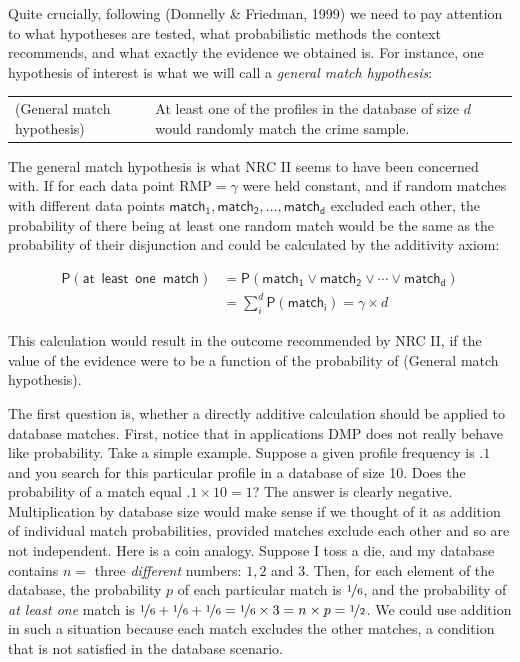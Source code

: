 \documentclass[10pt,dvipsnames,enabledeprecatedfontcommands]{scrartcl}
\newcommand{\pr}[1]{\mathsf{P}(#1)}
\begin{document}
Quite crucially, following (Donnelly \& Friedman, 1999) we need to pay
attention to what hypotheses are tested, what probabilistic methods the
context recommends, and what exactly the evidence we obtained is. For
instance, one hypothesis of interest is what we will call a
\emph{general match hypothesis}: \vspace{1mm}

\begin{tabular}{lp{8cm}}
(General match hypothesis) &
At least one of the profiles in the database of size $d$ 
would randomly match the crime sample.
\end{tabular}

\vspace{1mm} \noindent The general match hypothesis is what NRC II seems
to have been concerned with. If for each data point RMP\(=\gamma\) were
held constant, and if random matches with different data points
\(\mathsf{match_1, match_2, \dots, match_d}\) excluded each other, the
probability of there being at least one random match would be the same
as the probability of their disjunction and could be calculated by the
additivity axiom:

\begin{align*}
\pr{\mathsf{at\,\,\, least\,\,\, one\,\,\, match}} & = \pr{\mathsf{match_1} \vee \mathsf{match_2} \vee \cdots \vee \mathsf{match_d}} \\
& = \sum_{i}^d \pr{\mathsf{match_i}} = \gamma \times d
\end{align*}

This calculation would result in the outcome recommended by NRC II, if
the value of the evidence were to be a function of the probability of
(General match hypothesis).

The first question is, whether a directly additive calculation should be
applied to database matches. First, notice that in applications DMP does
not really behave like probability. Take a simple example. Suppose a
given profile frequency is \(.1\) and you search for this particular
profile in a database of size 10. Does the probability of a match equal
\(.1 \times 10=1\)? The answer is clearly negative. Multiplication by
database size would make sense if we thought of it as addition of
individual match probabilities, provided matches exclude each other and
so are not independent. Here is a coin analogy. Suppose I toss a die,
and my database contains \(n=\) three \emph{different} numbers: \(1, 2\)
and \(3\). Then, for each element of the database, the probability \(p\)
of each particular match is \(\nicefrac{1}{6}\), and the probability of
\emph{at least one} match is
\(\nicefrac{1}{6}+\nicefrac{1}{6}+\nicefrac{1}{6}=\nicefrac{1}{6}\times 3 = n\times p =\nicefrac{1}{2}\).
We could use addition in such a situation because each match excludes
the other matches, a condition that is not satisfied in the database
scenario.
\end{document}
